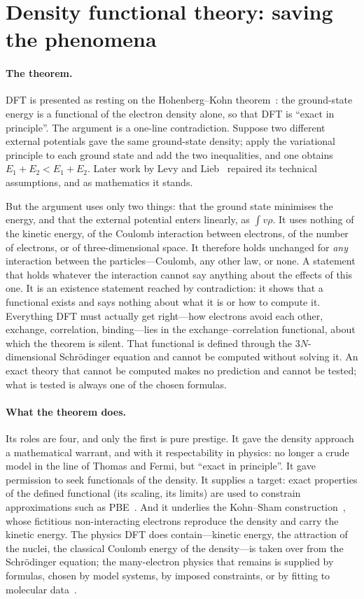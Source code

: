 \section{Density functional theory: saving the phenomena}\label{sec:saving-phenomena}

\paragraph{The theorem.} DFT is presented as resting on the Hohenberg--Kohn theorem~\cite{HK64}: the
ground-state energy is a functional of the electron density alone, so that DFT is ``exact in principle''.
The argument is a one-line contradiction. Suppose two different external potentials gave the same
ground-state density; apply the variational principle to each ground state and add the two inequalities,
and one obtains $E_1+E_2<E_1+E_2$. Later work by Levy and Lieb~\cite{Levy1979,Lieb1983} repaired its
technical assumptions, and as mathematics it stands.

But the argument uses only two things: that the ground state minimises the energy, and that the external
potential enters linearly, as $\int v\rho$. It uses nothing of the kinetic energy, of the Coulomb interaction
between electrons, of the number of electrons, or of three-dimensional space. It therefore holds unchanged
for \emph{any} interaction between the particles---Coulomb, any other law, or none. A statement that holds
whatever the interaction cannot say anything about the effects of this one. It is an existence statement
reached by contradiction: it shows that a functional exists and says nothing about what it is or how to
compute it. Everything DFT must actually get right---how electrons avoid each other, exchange, correlation,
binding---lies in the exchange--correlation functional, about which the theorem is silent. That functional
is defined through the $3N$-dimensional Schr\"odinger equation and cannot be computed without solving it.
An exact theory that cannot be computed makes no prediction and cannot be tested; what is tested is always
one of the chosen formulas.

\paragraph{What the theorem does.} Its roles are four, and only the first is pure prestige. It gave the
density approach a mathematical warrant, and with it respectability in physics: no longer a crude model in
the line of Thomas and Fermi, but ``exact in principle''. It gave permission to seek functionals of the
density. It supplies a target: exact properties of the defined functional (its scaling, its limits) are used
to constrain approximations such as PBE~\cite{PBE1996}. And it underlies the Kohn--Sham
construction~\cite{KS65}, whose fictitious non-interacting electrons reproduce the density and carry the
kinetic energy. The physics DFT does contain---kinetic energy, the attraction of the nuclei, the classical
Coulomb energy of the density---is taken over from the Schr\"odinger equation; the many-electron physics that
remains is supplied by formulas, chosen by model systems, by imposed constraints, or by fitting to molecular
data~\cite{Becke1993}.

